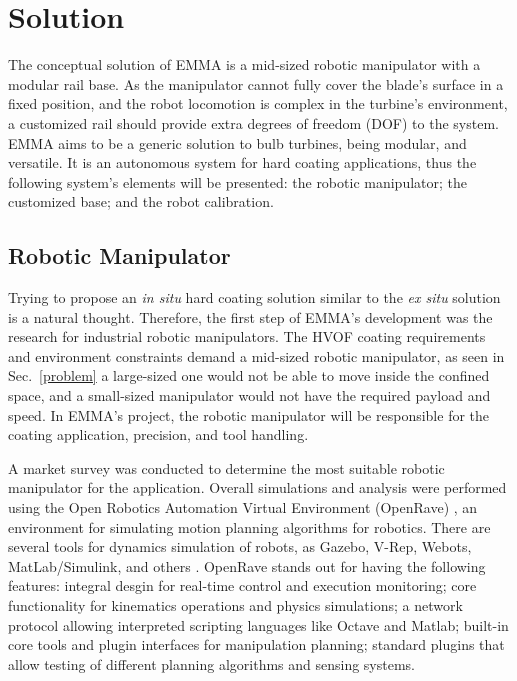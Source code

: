 \section{Solution}\label{solution}


The conceptual solution of EMMA is a mid-sized robotic manipulator with a
modular rail base. As the manipulator cannot fully cover the blade's surface in
a fixed position, and the robot locomotion is complex in the turbine's
environment, a customized rail should provide extra degrees of freedom (DOF) to
the system. EMMA aims to be a generic solution to bulb turbines, being modular,
and versatile. It is an autonomous system for hard coating applications, thus
the following system's elements will be presented: the robotic manipulator; the
customized base; and the robot calibration.


\subsection{Robotic Manipulator}\label{manipulator}
Trying to propose an \textit{in situ} hard coating solution similar to
the \textit{ex situ} solution is a natural thought. Therefore, the first step of
EMMA's development was the research for industrial robotic manipulators. The
HVOF coating requirements and environment constraints demand a mid-sized
robotic manipulator, as seen in Sec.~\ref{problem} a large-sized one would not
be able to move inside the confined space, and a small-sized manipulator would not
have the required payload and speed. In EMMA's project, the
robotic manipulator will be responsible for the coating application, precision, and tool handling.

A market survey was conducted to determine the most suitable robotic
manipulator for the application. Overall simu\-lations and analysis were performed using the Open
Robotics Automation Virtual Environment (OpenRave) \cite{diankov2008openrave},
an environment for simulating motion planning algorithms for robotics. There are
several tools for dynamics simulation of robots, as Gazebo, V-Rep,
Webots, MatLab/Simulink, and others%
. OpenRave stands out
for having the following features: integral desgin for real-time control and
execution monitoring; core functionality for kinematics operations and
physics simulations; a network protocol allowing interpreted scripting languages
like Octave and Matlab; built-in core tools and plugin interfaces for
manipulation planning; standard plugins that allow testing of different planning
algorithms and sensing systems.

